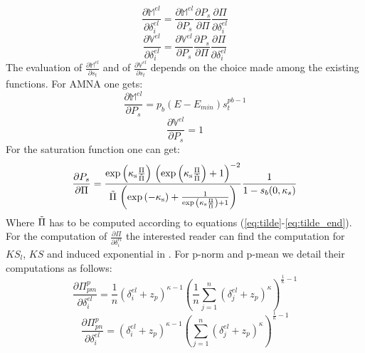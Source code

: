 \begin{equation}
  \frac{\partial \mathbb{M}^{el}}{\partial \delta_i^{el}} =\frac{\partial \mathbb{M}^{el}}{\partial P_s}\frac{\partial P_s}{\partial \Pi}\frac{\partial \Pi}{\partial\delta_i^{el}}
\end{equation}
\begin{equation}
  \frac{\partial \mathbb{V}^{el}}{\partial \delta_i^{el}} =\frac{\partial \mathbb{V}^{el}}{\partial P_s}\frac{\partial P_s}{\partial \Pi}\frac{\partial \Pi}{\partial\delta_i^{el}}
\end{equation}
The evaluation of $\frac{\partial \mathbb{M}^{el}}{\partial s_t}$ and of $\frac{\partial \mathbb{V}^{el}}{\partial s_t}$ depends on the choice made among the existing functions. For AMNA one gets:
\begin{equation}
\frac{\partial \mathbb{M}^{el}}{\partial P_s}=p_b(E-E_{min})s_t^{pb-1}   
\end{equation}
\begin{equation}
\frac{\partial \mathbb{V}^{el}}{\partial P_s}=1   
\end{equation}
For the saturation function one can get:
\begin{equation}
    \frac{\partial P_s}{\partial \Pi}=\frac{\exp\left(\mathrm{\kappa_s}{\frac{\mathrm{\Pi}}{\Tilde{\Pi}}}\right)\,{\left(\exp{\left(\mathrm{\kappa_s}\frac{\mathrm{\Pi}}{\Tilde{\Pi}}\right)}+1\right)}^{-2}}{\Tilde{\Pi}\,\left(\exp{\left(-\mathrm{\kappa_s}\right)}+\frac{1}{\exp{\left(\mathrm{\kappa_s}\frac{\mathrm{\Pi}}{\Tilde{\Pi}}\right)}+1}\right)}\frac{1}{1-s_b(0,\kappa_s)}
\end{equation}
Where $\Tilde{\Pi}$ has to be computed according to equations (\ref{eq:tilde}-\ref{eq:tilde_end}).
For the computation of $\frac{\partial \Pi}{\partial\delta_i^{el}}$ the interested reader can find the computation for $KS_l$, $KS$ and induced exponential in \cite{kennedy2015improved}. For p-norm and p-mean we detail their computations as follows:
\begin{equation}
    \frac{\partial \Pi_{pm}^p}{\partial\delta_i^{el}}=\frac{1}{n}\left(\delta_i^{el}+z_p\right)^{\kappa-1}\left(\frac{1}{n}\sum_{j=1}^n{\left(\delta_j^{el}+z_p\right)^{\kappa}}\right)^{\frac{1}{\kappa}-1}
\end{equation}
\begin{equation}
    \frac{\partial \Pi_{pn}^p}{\partial\delta_i^{el}}=\left(\delta_i^{el}+z_p\right)^{\kappa-1}\left(\sum_{j=1}^n{\left(\delta_j^{el}+z_p\right)^{\kappa}}\right)^{\frac{1}{\kappa}-1}
\end{equation}
